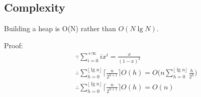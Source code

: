 \subsection{Complexity}
Building a heap is O(N) rather than $O(N \lg N)$.

Proof:
\begin{eqnarray*}
&& \because \sum_{i=0}^{+\infty} {ix^i} =\frac{x}{(1-x)^2} \\
&& \therefore \sum_{h=0}^{\lfloor\lg n\rfloor}{\Big\lceil\frac{n}{2^{h+1}}\Big\rceil O(h)} = O\Bigg(n\sum_{h=0}^{\lfloor\lg n\rfloor}{\frac{h}{2^h}}\Bigg) \\
&& \therefore \sum_{h=0}^{\lfloor\lg n\rfloor}{\Big\lceil\frac{n}{2^{h+1}}\Big\rceil
O(h)} = O(n)
\end{eqnarray*}
